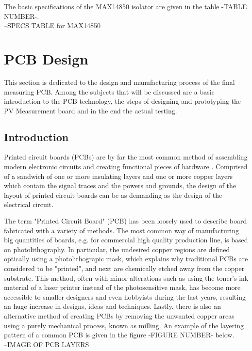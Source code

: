 The basic specifications of the MAX14850 isolator are given in the table -TABLE NUMBER-.\\

--SPECS TABLE for MAX14850\\

\section{PCB Design}
This section is dedicated to the design and manufacturing process of the final measuring PCB. Among the subjects that will be discussed are a basic introduction to the PCB technology, the steps of designing and prototyping the PV Measurement board and in the end the actual testing.

\subsection{Introduction}
Printed circuit boards (PCBs) are by far the most common method of assembling modern electronic circuits and creating functional pieces of hardware \cite{AD_BasicLinearDesign}. Comprised of a sandwich of one or more insulating layers and one or more copper layers which contain the signal traces and the powers and grounds, the design of the layout of printed circuit boards can be as demanding as the design of the electrical circuit.

The term "Printed Circuit Board" (PCB) has been loosely used to describe board fabricated with a variety of methods. \cite{TorontoUNI_GuideToPCB} The most common way of manufacturing big quantities of boards, e.g. for commercial high quality production line, is based on photolithography. In particular, the undesired copper regions are defined optically using a photolithograpic mask, which explains why traditional PCBs are considered to be "printed", and next are chemically etched away from the copper substrate. This method, often with minor alterations such as using the toner's ink material of a laser printer instead of the photosensitive mask, has become more accessible to smaller designers and even hobbyists during the last years, resulting an huge increase in designs, ideas and techniques. Lastly, there is also an alternative method of creating PCBs by removing the unwanted copper areas using a purely mechanical process, known as milling. An example of the layering pattern of a common PCB is given in the figure -FIGURE NUMBER- below.\\

--IMAGE OF PCB LAYERS\\

